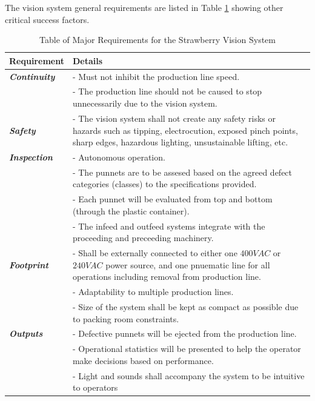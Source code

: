 \documentclass[fleqn,twoside]{article}
\begin{document}
The vision system general requirements are listed in Table \ref{tab:requirements} showing other critical success factors.



\renewcommand{\arraystretch}{0.8}%
\begin{longtable}{p{2.5cm}p{12cm}}
	\caption{Table of Major Requirements for the Strawberry Vision System}
	\label{tab:requirements} \\
	
	\hline\hline
	\textbf{Requirement} & \textbf{Details} \\[2pt]
	\hline \hline
	\textbf{\textit{Continuity}} 	& - Must not inhibit the production line speed. \\[2pt]
	& - The production line should not be caused to stop unnecessarily due to the vision system.\\[2pt]
	\hline
	\textbf{\textit{Safety}}    & - The vision system shall not create any safety risks or hazards such as tipping, electrocution, exposed pinch points, sharp edges, hazardous lighting, unsustainable lifting, etc.  \\[2pt]
	\hline
	\textbf{\textit{Inspection}} 	& - Autonomous operation.\\[2pt]
	& - The punnets are to be assesed based on the agreed defect categories (classes) to the specifications provided. \\[2pt]
	& - Each punnet will be evaluated from top and bottom (through the plastic container). \\[2pt]
	& - The infeed and outfeed systems integrate with the proceeding and preceeding machinery. \\[2pt]
	\hline
	\textbf{\textit{Footprint}}	& - Shall be externally connected to either one $400VAC$ or $240VAC$ power source, and one pnuematic line for all operations including removal from production line.  \\[2pt]
	& - Adaptability to multiple production lines. \\[2pt]
	& - Size of the system shall be kept as compact as possible due to packing room constraints. \\[2pt]
	\hline
	\textbf{\textit{Outputs}}	& - Defective punnets will be ejected from the production line.  \\[2pt]
	& - Operational statistics will be presented to help the operator make decisions based on performance.  \\[2pt]
	& - Light and sounds shall accompany the system to be intuitive to operators \\[2pt]

\end{longtable}
\end{document}
